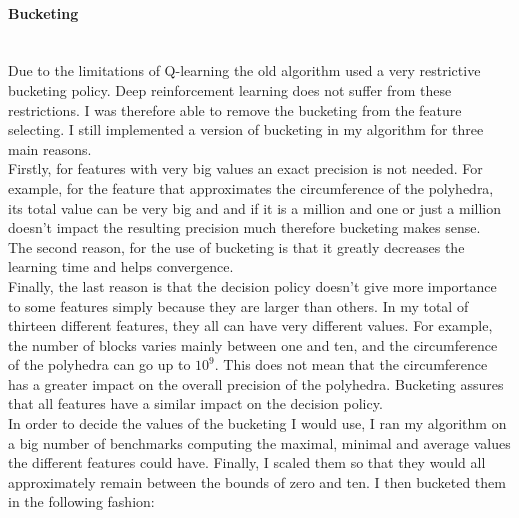 \paragraph{Bucketing}\mbox{}\\
Due to the limitations of Q-learning the old algorithm used a very restrictive bucketing policy. Deep reinforcement learning does not suffer from these restrictions. I was therefore able to remove the bucketing from the feature selecting. I still implemented a version of bucketing in my algorithm for three main reasons. \\
Firstly, for features with very big values an exact precision is not needed. For example, for the feature that approximates the circumference of the polyhedra, its total value can be very big and and if it is a million and one or just a million doesn't impact the resulting precision much therefore bucketing makes sense. \\
The second reason, for the use of bucketing is that it greatly decreases the learning time and helps convergence. \\
Finally, the last reason is that the decision policy doesn't give more importance to some features simply because they are larger than others. In my total of thirteen different features, they all can have very different values. For example, the number of blocks varies mainly between one and ten, and the circumference of the polyhedra can go up to $10^9$. This does not mean that the circumference has a greater impact on the overall precision of the polyhedra. Bucketing assures that all features have a similar impact on the decision policy.\\
In order to decide the values of the bucketing I would use, I ran my algorithm on a big number of benchmarks computing the maximal, minimal and average values the different features could have. Finally, I scaled them so that they would all approximately remain between the bounds of zero and ten. I then bucketed them in the following fashion:
